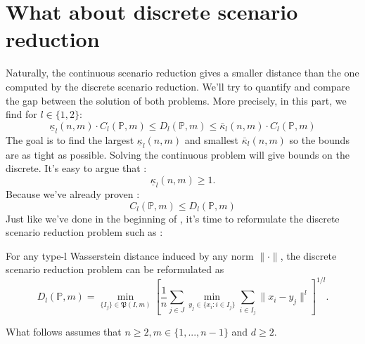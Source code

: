 \documentclass{amsart}
\begin{document}
\section{What about discrete scenario reduction}
Naturally, the continuous scenario reduction gives a smaller distance than the one computed by the discrete scenario reduction. We'll try to quantify and compare the gap between the solution of both problems. More precisely, in this part, we find for $l\in\{1,2\}$: 
$$\underline{\kappa}_l\left(n,m\right)\cdot C_l\left( \mathbb{P},m\right)\leq D_l\left(\mathbb{P},m\right)\leq \bar{\kappa}_l\left(n,m\right)\cdot C_l\left(\mathbb{P},m\right)$$
The goal is to find the largest $\underline{\kappa}_l\left(n,m\right)$ and smallest $\bar{\kappa}_l\left(n,m\right)$ so the bounds are as tight as possible. Solving the continuous problem will give bounds on the discrete. It's easy to argue that : 
$$
\underline\kappa_l\left(n,m\right)\geq1.
$$
Because we've already proven : 
$$
C_l\left( \mathbb{P},m\right)\leq D_l\left( \mathbb{P},m\right)
$$
Just like we've done in the beginning of , it's time to reformulate the discrete scenario reduction problem such as :
\begin{theorem}\label{reformulation 2}
    For any type-l Wasserstein distance induced by any norm $\lVert\cdot\rVert$, the discrete scenario reduction problem can be reformulated as 
    $$
    D_l\left(\mathbb{P},m\right)=\min_{\{I_j\}\in\mathfrak{P}\left(I,m\right)}\left[ \frac{1}{n}\sum_{j\in J}\min_{y_j\in\{x_i : i\in I_j\}}\sum_{i\in I_j}\lVert x_i-y_j\rVert^l\right]^{1/l}.
    $$
\end{theorem}
What follows assumes that $n\geq2, m\in\{1,...,n-1\}$ and $d\geq2.$
\end{document}
